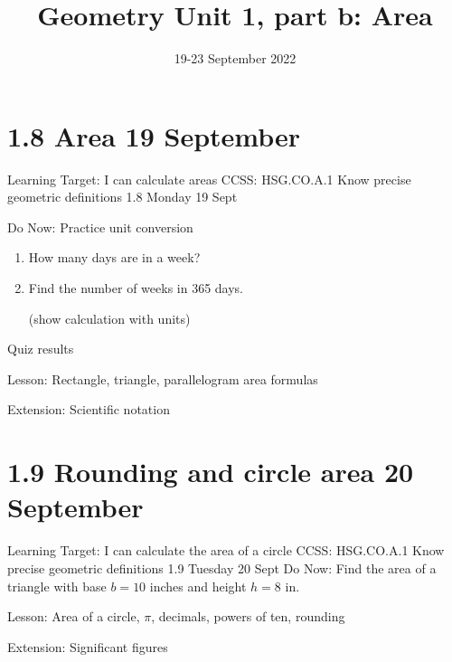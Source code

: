 

\title{Geometry Unit 1, part b: Area}
\date{19-23 September 2022}


\frame{\titlepage}

\section[Outline]{}
\frame{\tableofcontents}

\section{1.8 Area \hfill 19 September}
\begin{frame}{Learning Target: I can calculate areas}
  {CCSS: HSG.CO.A.1 Know precise geometric definitions \hfill \alert{1.8 Monday 19 Sept}}
  \begin{block}{Do Now: Practice unit conversion}
    \begin{enumerate}
        \item How many days are in a week?
        \item Find the number of weeks in 365 days. \par (show calculation with units)
    \end{enumerate}
    \end{block} \vspace{3cm}
    Quiz results \par \medskip
    Lesson: Rectangle, triangle, parallelogram area formulas \par \medskip
    Extension: Scientific notation
  \end{frame}

\section{1.9 Rounding and circle area \hfill 20 September}
\begin{frame}{Learning Target: I can calculate the area of a circle}
    {CCSS: HSG.CO.A.1 Know precise geometric definitions \hfill \alert{1.9 Tuesday 20 Sept}}
        Do Now: Find the area of a triangle with base $b=10$ inches and height $h=8$ in.  \begin{center}
            \end{center}

        Lesson: Area of a circle, $\pi$, decimals, powers of ten, rounding \par \medskip
        Extension: Significant figures
    \end{frame}

